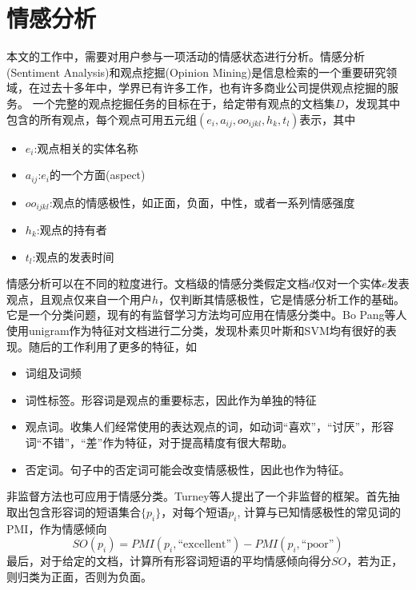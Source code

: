 \section{情感分析}
本文的工作中，需要对用户参与一项活动的情感状态进行分析。情感分析(Sentiment Analysis)和观点挖掘(Opinion Mining)是信息检索的一个重要研究领域，在过去十多年中，学界已有许多工作，也有许多商业公司提供观点挖掘的服务。
一个完整的观点挖掘任务的目标在于，给定带有观点的文档集$D$，发现其中包含的所有观点，每个观点可用五元组$(e_i, a_{ij}, oo_{ijkl},h_k, t_l)$表示，其中
\begin{itemize}
\item $e_i$:观点相关的实体名称
\item $a_{ij}$:$e_i$的一个方面(aspect)
\item $oo_{ijkl}$:观点的情感极性，如正面，负面，中性，或者一系列情感强度
\item $h_k$:观点的持有者
\item $t_l$:观点的发表时间
\end{itemize}

情感分析可以在不同的粒度进行。文档级的情感分类假定文档$d$仅对一个实体$e$发表观点，且观点仅来自一个用户$h$，仅判断其情感极性，它是情感分析工作的基础。
它是一个分类问题，现有的有监督学习方法均可应用在情感分类中。Bo Pang等人\cite{pang2002thumbs}使用unigram作为特征对文档进行二分类，发现朴素贝叶斯和SVM均有很好的表现。随后的工作\cite{pang2008opinion}利用了更多的特征，如
\begin{itemize}
\item 词组及词频
\item 词性标签。形容词是观点的重要标志，因此作为单独的特征
\item 观点词。收集人们经常使用的表达观点的词，如动词``喜欢''，``讨厌''，形容词``不错''，``差''作为特征，对于提高精度有很大帮助。
\item 否定词。句子中的否定词可能会改变情感极性，因此也作为特征。
\end{itemize}

非监督方法也可应用于情感分类。Turney等人\cite{turney2002thumbs}提出了一个非监督的框架。首先抽取出包含形容词的短语集合$\{p_i\}$，对每个短语$p_i$, 计算与已知情感极性的常见词的PMI，作为情感倾向
\[
SO(p_i) = PMI(p_i, \text{``excellent''}) - PMI(p_i, \text{``poor''})
\]
最后，对于给定的文档，计算所有形容词短语的平均情感倾向得分$SO$，若为正，则归类为正面，否则为负面。

